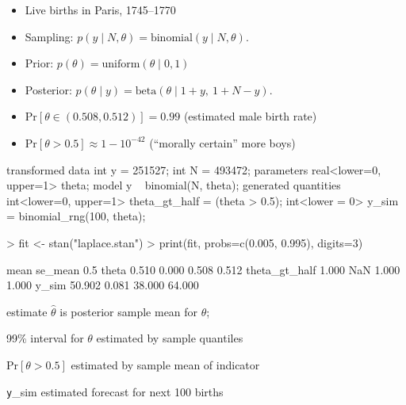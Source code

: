 \documentclass[10pt]{report}
\begin{document}

\begin{itemize}
\item Live births in Paris, 1745--1770
\item Sampling:
$p(y \mid N, \theta)
 = \textrm{binomial}(y \mid N, \theta).$
\item Prior:
$p(\theta)
 = \textrm{uniform}(\theta \mid 0, 1)$
\item Posterior:
$p(\theta \mid y)
 = \textrm{beta}(\theta \mid 1 + y, \ 1 + N - y).$
\item {\small $\textrm{Pr}[\theta \in (0.508, 0.512)] = 0.99$}
\hfill {\footnotesize (estimated male birth rate)}
\item {\small $\textrm{Pr}[\theta > 0.5] \approx 1 - 10^{-42}$}
\hfill {\footnotesize (``morally certain'' more boys)}
\end{itemize}

\begin{stancode}
transformed data {
  int y = 251527;  int N = 493472;
}
parameters {
  real<lower=0, upper=1> theta;
}
model {
  y ~ binomial(N, theta);
}
generated quantities {
  int<lower=0, upper=1> theta_gt_half = (theta > 0.5);
  int<lower = 0> y_sim = binomial_rng(100, theta);
}
\end{stancode}

%
\begin{codein}
> fit <- stan("laplace.stan")
> print(fit, probs=c(0.005, 0.995), digits=3)
\end{codein}
\begin{codeout}
                     mean se_mean   0.5%
theta               0.510   0.000  0.508   0.512
theta_gt_half       1.000     NaN  1.000   1.000
y_sim              50.902   0.081 38.000  64.000
\end{codeout}
%
\begin{subitemize}
\item estimate $\hat{\theta}$ is posterior sample mean for $\theta$;
\item 99\% interval for $\theta$ estimated by sample quantiles
\item $\textrm{Pr}[\theta > 0.5]$ estimated by sample mean of indicator
\item {\texttt y\_sim} estimated forecast for next 100 births
\end{subitemize}
\end{document}
